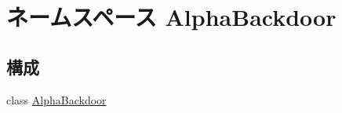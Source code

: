 \hypertarget{namespaceAlphaBackdoor}{
\section{ネームスペース AlphaBackdoor}
\label{namespaceAlphaBackdoor}
}
\subsection*{構成}
\begin{DoxyCompactItemize}
\item 
class \hyperlink{classAlphaBackdoor_1_1AlphaBackdoor}{AlphaBackdoor}
\end{DoxyCompactItemize}
